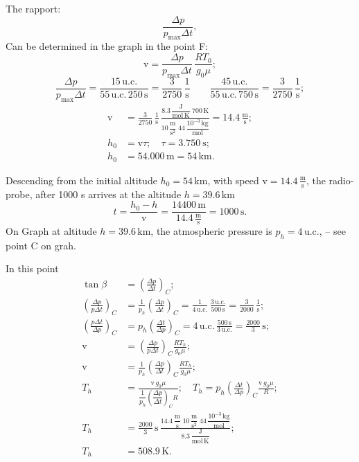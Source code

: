 \begin{description}
The rapport: %
\[
\frac{\Delta p}{p_{\max}\Delta t},
\]
Can be determined in the graph in the point F:
\[
\mathrm{v} = \frac{\Delta p}{p_{\max}\Delta t}\,\frac{RT_0}{g_0\mu};
\]
\[
\frac{\Delta p}{p_{\max}\Delta t}
= \frac{15\,\mathrm{u.c.}}{55\,\mathrm{u.c.}\,250\,\mathrm{s}}
= \frac{3}{2750}\,\frac{1}{\mathrm{s}}
\qquad
\frac{45\,\mathrm{u.c.}}{55\,\mathrm{u.c.}\,750\,\mathrm{s}}
= \frac{3}{2750}\,\frac{1}{\mathrm{s}};
\]
\begin{align*}
\mathrm{v} &= \frac{3}{2750}\,\frac{1}{\mathrm{s}}\,
\frac{8.3\,\dfrac{\mathrm{J}}{\mathrm{mol\,K}}\;700\,\mathrm{K}}
     {10\,\dfrac{\mathrm{m}}{\mathrm{s}^2}\;44\,\dfrac{10^{-3}\,\mathrm{kg}}{\mathrm{mol}}}
= 14.4\,\frac{\mathrm{m}}{\mathrm{s}};\\
h_0 &= \mathrm{v}\tau;\quad \tau = 3.750\ \mathrm{s};\\
h_0 &= 54.000\,\mathrm{m} = 54\,\mathrm{km}.
\end{align*}

\item[b)]
Descending from the initial altitude $h_0 = 54\,\mathrm{km}$, with speed
$\mathrm{v} = 14.4\,\frac{\mathrm{m}}{\mathrm{s}}$, the radio-probe, after 1000 s arrives
at the altitude $h = 39.6\,\mathrm{km}$
\[
t = \frac{h_0 - h}{\mathrm{v}} = \frac{14400\,\mathrm{m}}{14.4\,\frac{\mathrm{m}}{\mathrm{s}}}
= 1000\,\mathrm{s}.
\]
On Graph at altitude $h = 39.6\,\mathrm{km}$, the atmospheric pressure is
$p_h = 4\,\mathrm{u.c.}$, -- see point C on grah. %

In this point
\begin{align*}
\tan\beta &= \left(\frac{\Delta p}{\Delta t}\right)_{\!C};\\
\left(\frac{\Delta p}{p\Delta t}\right)_{\!C}
&= \frac{1}{p_h}\left(\frac{\Delta p}{\Delta t}\right)_{\!C}
= \frac{1}{4\,\mathrm{u.c.}}\,\frac{3\,\mathrm{u.c.}}{500\,\mathrm{s}}
= \frac{3}{2000}\,\frac{1}{\mathrm{s}};\\
\left(\frac{p\Delta t}{\Delta p}\right)_{\!C}
&= p_h\left(\frac{\Delta t}{\Delta p}\right)_{\!C}
= 4\,\mathrm{u.c.}\,\frac{500\,\mathrm{s}}{3\,\mathrm{u.c.}}
= \frac{2000}{3}\,\mathrm{s};\\
\mathrm{v} &= \left(\frac{\Delta p}{p\Delta t}\right)_{\!C}\frac{RT_h}{g_0\mu};\\
\mathrm{v} &= \frac{1}{p_h}\left(\frac{\Delta p}{\Delta t}\right)_{\!C}\frac{RT_h}{g_0\mu};\\
T_h &= \frac{\mathrm{v}\,g_0\mu}
{\dfrac{1}{p_h}\left(\dfrac{\Delta p}{\Delta t}\right)_{\!C}R};\quad
T_h = p_h\left(\frac{\Delta t}{\Delta p}\right)_{\!C}\frac{\mathrm{v}\,g_0\mu}{R};\\
T_h &= \frac{2000}{3}\,\mathrm{s}\,
\frac{14.4\,\dfrac{\mathrm{m}}{\mathrm{s}}\;10\,\dfrac{\mathrm{m}}{\mathrm{s}^2}\;
      44\,\dfrac{10^{-3}\,\mathrm{kg}}{\mathrm{mol}}}
     {8.3\,\dfrac{\mathrm{J}}{\mathrm{mol\,K}}};\\
T_h &= 508.9\,\mathrm{K}.
\end{align*}


\end{description}

